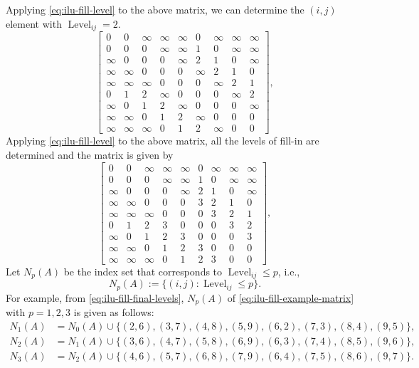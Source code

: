 {Applying \eqref{eq:ilu-fill-level} to the above matrix, we can determine the $(i,j)$ element with $\operatorname{Level}_{ij}=2$.}
\[\begin{bmatrix}
0&0&\infty&\infty&\infty&0&\infty&\infty&\infty\\
0&0&0&\infty&\infty&1&0&\infty&\infty\\
\infty&0&0&0&\infty&2&1&0&\infty\\
\infty&\infty&0&0&0&\infty&2&1&0\\
\infty&\infty&\infty&0&0&0&\infty&2&1\\
0&1&2&\infty&0&0&0&\infty&2\\
\infty&0&1&2&\infty&0&0&0&\infty\\
\infty&\infty&0&1&2&\infty&0&0&0\\
\infty&\infty&\infty&0&1&2&\infty&0&0
\end{bmatrix},\]
{Applying \eqref{eq:ilu-fill-level} to the above matrix, all the levels of fill-in are determined and the matrix is given by}
\begin{equation}\label{eq:ilu-fill-final-levels}\begin{bmatrix}
0&0&\infty&\infty&\infty&0&\infty&\infty&\infty\\
0&0&0&\infty&\infty&1&0&\infty&\infty\\
\infty&0&0&0&\infty&2&1&0&\infty\\
\infty&\infty&0&0&0&3&2&1&0\\
\infty&\infty&\infty&0&0&0&3&2&1\\
0&1&2&3&0&0&0&3&2\\
\infty&0&1&2&3&0&0&0&3\\
\infty&\infty&0&1&2&3&0&0&0\\
\infty&\infty&\infty&0&1&2&3&0&0
\end{bmatrix},\end{equation}
{Let $N_p(A)$ be the index set that corresponds to $\operatorname{Level}_{ij}\le p$, i.e.,}
\[N_p(A):=\{(i,j):\operatorname{Level}_{ij}\le p\}.\]
{For example, from \eqref{eq:ilu-fill-final-levels}, $N_p(A)$ of \eqref{eq:ilu-fill-example-matrix} with $p=1,2,3$ is given as follows:}
\[\begin{aligned}
N_1(A)&=N_0(A)\cup\{(2,6),(3,7),(4,8),(5,9),(6,2),(7,3),(8,4),(9,5)\},\\
N_2(A)&=N_1(A)\cup\{(3,6),(4,7),(5,8),(6,9),(6,3),(7,4),(8,5),(9,6)\},\\
N_3(A)&=N_2(A)\cup\{(4,6),(5,7),(6,8),(7,9),(6,4),(7,5),(8,6),(9,7)\}.
\end{aligned}\]
